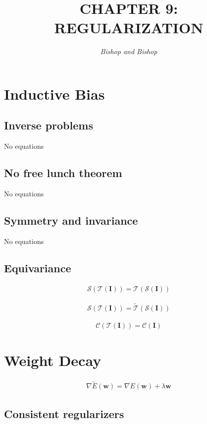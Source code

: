 \documentclass{article}
\title{\LARGE\scshape\MakeUppercase{Chapter 9: Regularization}}
\author{\textit{Bishop and Bishop}}
\date{}
\begin{document}
\maketitle

\section{Inductive Bias}

\subsection{Inverse problems}
No equations

\subsection{No free lunch theorem}
No equations

\subsection{Symmetry and invariance}
No equations

\subsection{Equivariance}
\begin{align*}
\mathcal{S}(\mathcal{T}(\mathbf{I})) = \mathcal{T}(\mathcal{S}(\mathbf{I})) 
\tag{9.2}
\end{align*}

\begin{align*}
\mathcal{S}(\mathcal{T}(\mathbf{I})) = \widetilde{\mathcal{T}}(\mathcal{S}(\mathbf{I})) 
\tag{9.3}
\end{align*}

\begin{align*}
\mathcal{C}(\mathcal{T}(\mathbf{I})) = \mathcal{C}(\mathbf{I}) 
\tag{9.4}
\end{align*}

\section{Weight Decay}

\begin{align*}
\nabla \widetilde{E}(\mathbf{w})=\nabla E(\mathbf{w})+\lambda \mathbf{w} 
\tag{9.5}
\end{align*}

\subsection{Consistent regularizers}
\end{document}
